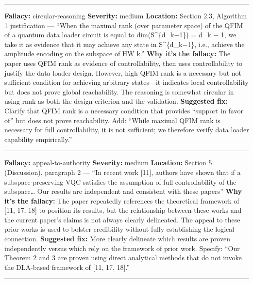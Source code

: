 \documentclass[10pt,letterpaper]{article}
\begin{document}
\begin{center}\rule{0.5\linewidth}{0.5pt}\end{center}

\textbf{Fallacy:} circular-reasoning
\textbf{Severity:} medium
\textbf{Location:} Section 2.3, Algorithm 1 justification --- ``When the maximal rank (over parameter space) of the QFIM of a quantum data loader circuit is equal to dim(S\^{}\{d\_k−1\}) = d\_k − 1, we take it as evidence that it may achieve any state in S\^{}\{d\_k−1\}, i.e., achieve the amplitude encoding on the subspace of HW k.''
\textbf{Why it's the fallacy:} The paper uses QFIM rank as evidence of controllability, then uses controllability to justify the data loader design. However, high QFIM rank is a necessary but not sufficient condition for achieving arbitrary states---it indicates local controllability but does not prove global reachability. The reasoning is somewhat circular in using rank as both the design criterion and the validation.
\textbf{Suggested fix:} Clarify that QFIM rank is a necessary condition that provides ``support in favor of'' but does not prove reachability. Add: ``While maximal QFIM rank is necessary for full controllability, it is not sufficient; we therefore verify data loader capability empirically.''

\begin{center}\rule{0.5\linewidth}{0.5pt}\end{center}

\textbf{Fallacy:} appeal-to-authority
\textbf{Severity:} medium
\textbf{Location:} Section 5 (Discussion), paragraph 2 --- ``In recent work {[}11{]}, authors have shown that if a subspace-preserving VQC satisfies the assumption of full controllability of the subspace\ldots{} Our results are independent and consistent with these papers''
\textbf{Why it's the fallacy:} The paper repeatedly references the theoretical framework of {[}11, 17, 18{]} to position its results, but the relationship between these works and the current paper's claims is not always clearly delineated. The appeal to these prior works is used to bolster credibility without fully establishing the logical connection.
\textbf{Suggested fix:} More clearly delineate which results are proven independently versus which rely on the framework of prior work. Specify: ``Our Theorem 2 and 3 are proven using direct analytical methods that do not invoke the DLA-based framework of {[}11, 17, 18{]}.''

\begin{center}\rule{0.5\linewidth}{0.5pt}\end{center}
\end{document}

